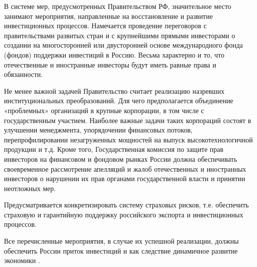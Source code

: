 В системе мер, предусмотренных Правительством РФ, значительное место занимают мероприятия, направленные на восстановление и развитие инвестиционных процессов. Намечается проведение переговоров с правительствами развитых стран и с крупнейшими прямыми инвесторами о создании на многосторонней или двусторонней основе международного фонда (фондов) поддержки инвестиций в Россию. Весьма характерно и то, что отечественные и иностранные инвесторы будут иметь равные права и обязанности.

Не менее важной задачей Правительство считает реализацию назревших институциональных преобразований. Для чего предполагается объединение «проблемных» организаций в крупные корпорации, в том числе с государственным участием. Наиболее важные задачи таких корпораций состоят в улучшении менеджмента, упорядочении финансовых потоков, перепрофилировании незагруженных мощностей на выпуск высокотехнологичной продукции и т.д. Кроме того, Государственная комиссия по защите прав инвесторов на финансовом и фондовом рынках России должна обеспечивать своевременное рассмотрение апелляций и жалоб отечественных и иностранных инвесторов о нарушении их прав органами государственной власти и принятии неотложных мер.

Предусматривается конкретизировать систему страховых рисков, т.е. обеспечить страховую и гарантийную поддержку российского экспорта и инвестиционных процессов.

Все перечисленные мероприятия, в случае их успешной реализации, должны обеспечить России приток инвестиций и как следствие динамичное развитие экономики \cite{01}.

